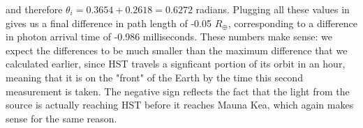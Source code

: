 \documentclass[12pt]{article}
\begin{document}
\begin{onehalfspacing}
and therefore $\theta_i = 0.3654 + 0.2618 = 0.6272$ radians. Plugging all these values in gives us a final difference in path length of -0.05 $R_{\oplus}$, corresponding to a difference in photon arrival time of -0.986 milliseconds. These numbers make sense: we expect the differences to be much smaller than the maximum difference that we calculated earlier, since HST travels a signficant portion of its orbit in an hour, meaning that it is on the "front" of the Earth by the time this second measurement is taken. The negative sign reflects the fact that the light from the source is actually reaching HST before it reaches Mauna Kea, which again makes sense for the same reason.










\newpage




\end{onehalfspacing}
\end{document}
